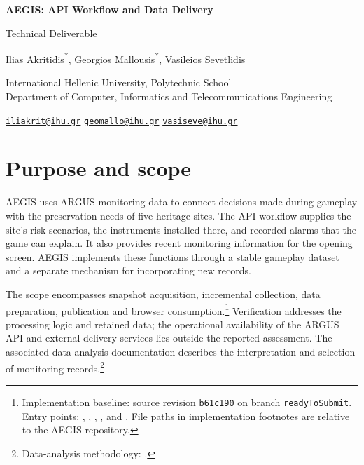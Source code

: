 \documentclass[10pt,a4paper]{article}
\begin{document}
\fontsize{10.5}{13}\selectfont
\begin{center}
{\LARGE\bfseries AEGIS: API Workflow and Data Delivery\par}
\vspace{0.5em}
{\large Technical Deliverable\par}
\vspace{0.6em}
Ilias Akritidis\textsuperscript{*}, Georgios Mallousis\textsuperscript{*}, Vasileios Sevetlidis\par
\vspace{0.3em}
{\small International Hellenic University, Polytechnic School\\
Department of Computer, Informatics and Telecommunications Engineering\par}
{\small\href{mailto:iliakrit@ihu.gr}{\texttt{iliakrit@ihu.gr}}\quad
\href{mailto:geomallo@ihu.gr}{\texttt{geomallo@ihu.gr}}\quad
\href{mailto:vasiseve@ihu.gr}{\texttt{vasiseve@ihu.gr}}\par}
\vspace{0.6em}
\end{center}
{\renewcommand{\thefootnote}{\fnsymbol{footnote}}}


\section{Purpose and scope}
AEGIS uses ARGUS monitoring data to connect decisions made during gameplay with the preservation needs of five heritage sites. The API workflow supplies the site's risk scenarios, the instruments installed there, and recorded alarms that the game can explain. It also provides recent monitoring information for the opening screen. AEGIS implements these functions through a stable gameplay dataset and a separate mechanism for incorporating new records.

The scope encompasses snapshot acquisition, incremental collection, data preparation, publication and browser consumption.\footnote{Implementation baseline: source revision \texttt{b61c190} on branch \texttt{readyToSubmit}. Entry points: , , , , and . File paths in implementation footnotes are relative to the AEGIS repository.} Verification addresses the processing logic and retained data; the operational availability of the ARGUS API and external delivery services lies outside the reported assessment. The associated data-analysis documentation describes the interpretation and selection of monitoring records.\footnote{Data-analysis methodology: .}
\end{document}
